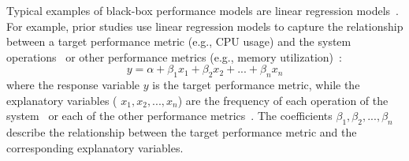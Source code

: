 Typical examples of black-box performance models are linear regression models~\citep{DBLP:conf/wosp/ShangHNF15, Yao:2018:LSL:3184407.3184416}. 
For example, prior studies use linear regression models to capture the relationship between a target performance metric (e.g., CPU usage) and the system operations~\citep{Yao:2018:LSL:3184407.3184416} or other performance metrics (e.g., memory utilization)~\citep{DBLP:conf/wosp/ShangHNF15}:
\begin{equation}
y=\alpha + \beta_1 x_1 + \beta_2 x_2+...+\beta_n x_n
\end{equation}
where the response variable $y$ is the target performance metric, while the explanatory variables ( $x_1,x_2,...,x_n$) are the frequency of each operation of the system~\citep{Yao:2018:LSL:3184407.3184416} or each of the other performance metrics~\citep{DBLP:conf/wosp/ShangHNF15}.
The coefficients $\beta_1,\beta_2,...,\beta_n$ describe the relationship between the target performance metric and the corresponding explanatory variables. %


